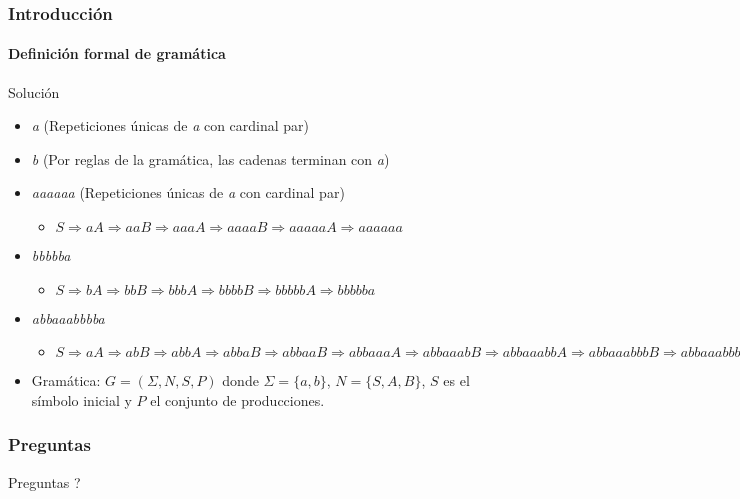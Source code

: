 \documentclass{beamer}
\begin{document}
		\begin{frame}
            \frametitle{Introducci\'on}
            \framesubtitle{Definici\'on formal de gram\'atica}

            \begin{exampleblock}{Soluci\'on}
                \begin{itemize}
                    \item[\color{red}{$\times$}] \emph{a}  (Repeticiones \'unicas  de \emph{a} con cardinal par)
                    \item[\color{red}{$\times$}] \emph{b} (Por reglas de la gram\'atica, las cadenas terminan con \emph{a})
                    \item[\checkmark] \emph{aaaaaa} (Repeticiones \'unicas de \emph{a} con cardinal par)
                    \begin{itemize}
                        \item[] $S \Rightarrow aA \Rightarrow aaB \Rightarrow aaaA \Rightarrow aaaaB \Rightarrow aaaaaA \Rightarrow aaaaaa$
                    \end{itemize}
                    \item[\checkmark] \emph{bbbbba}
                    \begin{itemize}
                        \item[] $S \Rightarrow bA \Rightarrow bbB \Rightarrow bbbA \Rightarrow bbbbB \Rightarrow bbbbbA \Rightarrow bbbbba$
                    \end{itemize}
                    \item[\checkmark] \emph{abbaaabbbba}
                    \begin{itemize}
                        \item[] $S \Rightarrow aA \Rightarrow abB \Rightarrow abbA \Rightarrow abbaB \Rightarrow abbaaB \Rightarrow abbaaaA \Rightarrow abbaaabB \Rightarrow abbaaabbA \Rightarrow abbaaabbbB \Rightarrow abbaaabbbbA \Rightarrow abbaaabbbba$
                    \end{itemize}
                \end{itemize}
                \begin{itemize}
                    \item[] Gram\'atica: $G = (\Sigma, N, S, P)$ donde $\Sigma = \{a,b\}$, $N = \{S, A, B\}$, $S$ es el s\'imbolo inicial y $P$ el conjunto de producciones.
                \end{itemize}
			\end{exampleblock}
		\end{frame}

		\begin{frame}
			\frametitle{Preguntas}

			\hspace{4cm}\huge{Preguntas ?}
		
		\end{frame}
	
\end{document}
